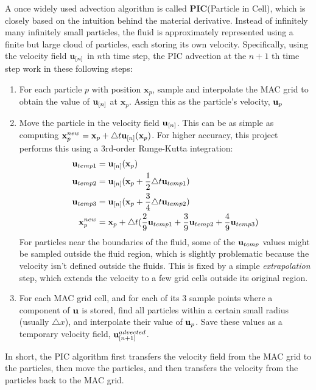 A once widely used advection algorithm is called \textbf{PIC}(Particle in Cell), which is closely based on the intuition behind the material derivative. Instead of infinitely many infinitely small particles, the fluid is approximately represented using a finite but large cloud of particles, each storing its own velocity. Specifically, using the velocity field $\textbf{u}_{[n]}$ in $n$th time step, the PIC advection at the $n+1$ th time step work in these following steps: 

\begin{enumerate}
    \item For each particle $p$ with position $\textbf{x}_p$, sample and interpolate the MAC grid to obtain the value of $\textbf{u}_{[n]}$ at $\textbf{x}_p$. Assign this as the particle's velocity,  $\textbf{u}_p$
    
    \item Move the particle in the velocity field $\textbf{u}_{[n]}$. This can be as simple as computing $\textbf{x}_p^{new} = \textbf{x}_p + \triangle t \textbf{u}_{[n]}(\textbf{x}_p)$. For higher accuracy, this project performs this using a 3rd-order Runge-Kutta integration:
    \begin{equation*}
        \begin{aligned}
            \textbf{u}_{temp1} &= \textbf{u}_{[n]}(\textbf{x}_p) \\
            \textbf{u}_{temp2} &= \textbf{u}_{[n]}(\textbf{x}_p + \frac{1}{2}\triangle t \textbf{u}_{temp1}) \\
            \textbf{u}_{temp3} &= \textbf{u}_{[n]}(\textbf{x}_p + \frac{3}{4}\triangle t \textbf{u}_{temp2})\\
            \textbf{x}_p^{new} &=  \textbf{x}_p + \triangle t(
                \frac{2}{9}\textbf{u}_{temp1} + \frac{3}{9}\textbf{u}_{temp2} + \frac{4}{9}\textbf{u}_{temp3}
                )
        \end{aligned}
    \end{equation*}
    For particles near the boundaries of the fluid, some of the $\textbf{u}_{temp}$ values might be sampled outside the fluid region, which is slightly problematic because the velocity isn't defined outside the fluids. This is fixed by a simple \textit{extrapolation} step, which extends the velocity to a few grid cells outside its original region.
    
    
    \item For each MAC grid cell, and for each of its 3 sample points where a component of $\textbf{u}$ is stored, find all particles within a certain small radius (usually $\triangle x$), and interpolate their value of $\textbf{u}_p$. Save these values as a temporary velocity field, $\textbf{u}_{[n+1]}^{advected}$.
\end{enumerate}
In short, the PIC algorithm first transfers the velocity field from the MAC grid to the particles, then move the particles, and then transfers the velocity from the particles back to the MAC grid.




